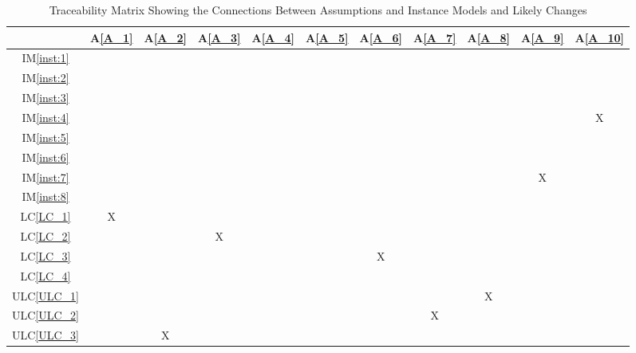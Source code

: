 \documentclass[12pt]{article}
\newcommand{\aref}[1]{A\ref{#1}}
\newcommand{\iref}[1]{IM\ref{#1}}
\newcommand{\lcref}[1]{LC\ref{#1}}
\newcommand{\ulcref}[1]{ULC\ref{#1}}
\begin{document}
\begin{table}[H]
\centering
\begin{tabular}{|c|c|c|c|c|c|c|c|c|c|c|}
\hline
	& \aref{A_1}& \aref{A_2}& \aref{A_3}& \aref{A_4}& \aref{A_5}& \aref{A_6}& \aref{A_7}& \aref{A_8}& \aref{A_9}& \aref{A_10}\\
\hline
\iref{inst:1}       & & & & & & & & & & \\ \hline
\iref{inst:2}       & & & & & & & & & & \\ \hline
\iref{inst:3}       & & & & & & & & & & \\ \hline
\iref{inst:4}       & & & & & & & & & &X \\ \hline
\iref{inst:5}       & & & & & & & & & & \\ \hline
\iref{inst:6}       & & & & & & & & & & \\ \hline
\iref{inst:7}       & & & & & & & & &X& \\ \hline
\iref{inst:8}       & & & & & & & & & & \\ \hline
\lcref{LC_1}        &X& & & & & & & & & \\ \hline
\lcref{LC_2}        & & &X& & & & & & & \\ \hline
\lcref{LC_3}        & & & & & &X& & & & \\ \hline
\lcref{LC_4}        & & & & & & & & & & \\ \hline
\ulcref{ULC_1}      & & & & & & & &X& & \\ \hline
\ulcref{ULC_2}      & & & & & & &X& & & \\ \hline
\ulcref{ULC_3}      & &X& & & & & & & & \\ \hline
\end{tabular}
\caption{Traceability Matrix Showing the Connections Between Assumptions and Instance Models and Likely Changes}
\label{Table:trace_Assumptions}
\end{table}
\end{document}
